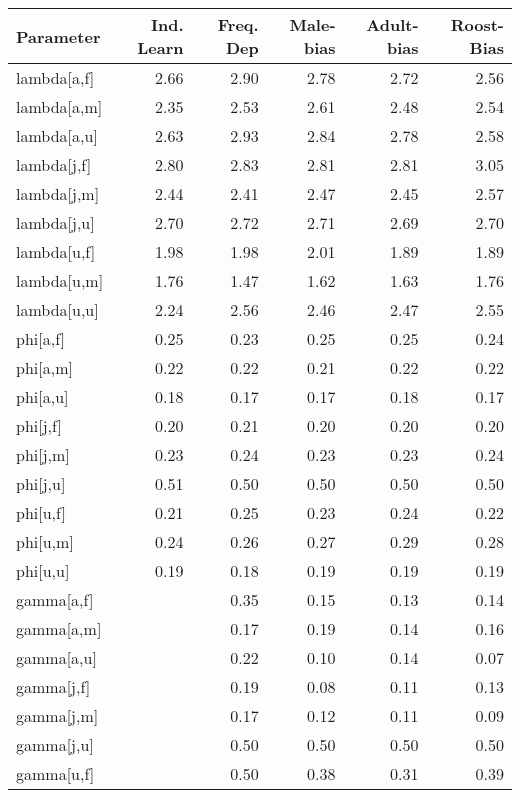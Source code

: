 \begin{table}[ht]
\centering
\begingroup\scriptsize
\begin{tabular}{lrrrrr}
  \hline
Parameter & Ind. Learn & Freq. Dep & Male-bias & Adult-bias & Roost-Bias \\ 
  \hline
lambda[a,f] & 2.66 & 2.90 & 2.78 & 2.72 & 2.56 \\ 
  lambda[a,m] & 2.35 & 2.53 & 2.61 & 2.48 & 2.54 \\ 
  lambda[a,u] & 2.63 & 2.93 & 2.84 & 2.78 & 2.58 \\ 
  lambda[j,f] & 2.80 & 2.83 & 2.81 & 2.81 & 3.05 \\ 
  lambda[j,m] & 2.44 & 2.41 & 2.47 & 2.45 & 2.57 \\ 
  lambda[j,u] & 2.70 & 2.72 & 2.71 & 2.69 & 2.70 \\ 
  lambda[u,f] & 1.98 & 1.98 & 2.01 & 1.89 & 1.89 \\ 
  lambda[u,m] & 1.76 & 1.47 & 1.62 & 1.63 & 1.76 \\ 
  lambda[u,u] & 2.24 & 2.56 & 2.46 & 2.47 & 2.55 \\ 
  phi[a,f] & 0.25 & 0.23 & 0.25 & 0.25 & 0.24 \\ 
  phi[a,m] & 0.22 & 0.22 & 0.21 & 0.22 & 0.22 \\ 
  phi[a,u] & 0.18 & 0.17 & 0.17 & 0.18 & 0.17 \\ 
  phi[j,f] & 0.20 & 0.21 & 0.20 & 0.20 & 0.20 \\ 
  phi[j,m] & 0.23 & 0.24 & 0.23 & 0.23 & 0.24 \\ 
  phi[j,u] & 0.51 & 0.50 & 0.50 & 0.50 & 0.50 \\ 
  phi[u,f] & 0.21 & 0.25 & 0.23 & 0.24 & 0.22 \\ 
  phi[u,m] & 0.24 & 0.26 & 0.27 & 0.29 & 0.28 \\ 
  phi[u,u] & 0.19 & 0.18 & 0.19 & 0.19 & 0.19 \\ 
  gamma[a,f] &  & 0.35 & 0.15 & 0.13 & 0.14 \\ 
  gamma[a,m] &  & 0.17 & 0.19 & 0.14 & 0.16 \\ 
  gamma[a,u] &  & 0.22 & 0.10 & 0.14 & 0.07 \\ 
  gamma[j,f] &  & 0.19 & 0.08 & 0.11 & 0.13 \\ 
  gamma[j,m] &  & 0.17 & 0.12 & 0.11 & 0.09 \\ 
  gamma[j,u] &  & 0.50 & 0.50 & 0.50 & 0.50 \\ 
  gamma[u,f] &  & 0.50 & 0.38 & 0.31 & 0.39 \\ 

\end{tabular}
\end{table}
